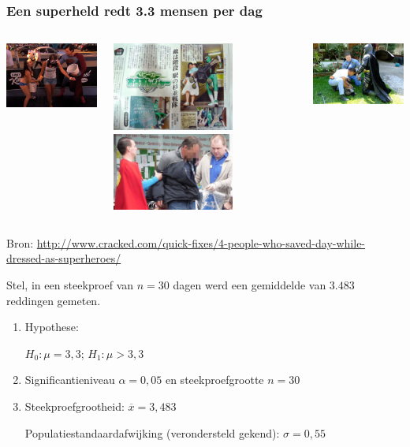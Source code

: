 \documentclass{beamer}
\begin{document}
\begin{frame}
  \frametitle{Een superheld redt 3.3 mensen per dag}

  \begin{columns}
    \centering
    \includegraphics[width=4cm]{img/les5-gered1}

    \includegraphics[width=4cm]{img/les5-gered2}
    \centering
    \includegraphics[width=4cm]{img/les5-gered3}

    \includegraphics[width=4cm]{img/les5-gered4}
  \end{columns}

  \vfill
  \centering
  \small{Bron: \url{http://www.cracked.com/quick-fixes/4-people-who-saved-day-while-dressed-as-superheroes/}}
\end{frame}

\begin{frame}

  Stel, in een steekproef van $n = 30$ dagen werd een gemiddelde van $3.483$ reddingen gemeten.

  \begin{enumerate}
    \item Hypothese:
    
    $H_0: \mu = 3,3$; $H_1: \mu > 3,3$
    
    \item Significantieniveau $\alpha = 0,05$ en steekproefgrootte $n = 30$
    
    \item Steekproefgrootheid: $\overline{x} = 3,483$
    
    Populatiestandaardafwijking (verondersteld gekend): $\sigma = 0,55$
  \end{enumerate}
\end{frame}
\end{document}
